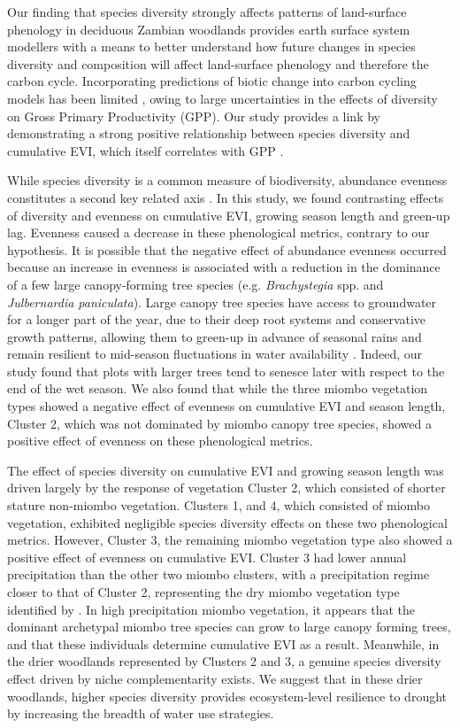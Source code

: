 \begin{refsection}
Our finding that species diversity strongly affects patterns of land-surface phenology in deciduous Zambian woodlands provides earth surface system modellers with a means to better understand how future changes in species diversity and composition will affect land-surface phenology and therefore the carbon cycle. Incorporating predictions of biotic change into carbon cycling models has been limited \citep{Ahlstrom2015, Bodegom2011}, owing to large uncertainties in the effects of diversity on Gross Primary Productivity (GPP). Our study provides a link by demonstrating a strong positive relationship between species diversity and cumulative EVI, which itself correlates with GPP \citep{Sjostrom2011}.

While species diversity is a common measure of biodiversity, abundance evenness constitutes a second key related axis \citep{Wilsey2005, Hillebrand2008, Jost2010}. In this study, we found contrasting effects of diversity and evenness on cumulative EVI, growing season length and green-up lag. Evenness caused a decrease in these phenological metrics, contrary to our hypothesis. It is possible that the negative effect of abundance evenness occurred because an increase in evenness is associated with a reduction in the dominance of a few large canopy-forming tree species (e.g. \textit{Brachystegia} spp. and \textit{Julbernardia paniculata}). Large canopy tree species have access to groundwater for a longer part of the year, due to their deep root systems and conservative growth patterns, allowing them to green-up in advance of seasonal rains and remain resilient to mid-season fluctuations in water availability \citep{Zhou2020}. Indeed, our study found that plots with larger trees tend to senesce later with respect to the end of the wet season. We also found that while the three miombo vegetation types showed a negative effect of evenness on cumulative EVI and season length, Cluster 2, which was not dominated by miombo canopy tree species, showed a positive effect of evenness on these phenological metrics. 

The effect of species diversity on cumulative EVI and growing season length was driven largely by the response of vegetation Cluster 2, which consisted of shorter stature non-miombo vegetation. Clusters 1, and 4, which consisted of miombo vegetation, exhibited negligible species diversity effects on these two phenological metrics. However, Cluster 3, the remaining miombo vegetation type also showed a positive effect of evenness on cumulative EVI. Cluster 3 had lower annual precipitation than the other two miombo clusters, with a precipitation regime closer to that of Cluster 2, representing the dry miombo vegetation type identified by \citet{White1983}. In high precipitation miombo vegetation, it appears that the dominant archetypal miombo tree species can grow to large canopy forming trees, and that these individuals determine cumulative EVI as a result. Meanwhile, in the drier woodlands represented by Clusters 2 and 3, a genuine species diversity effect driven by niche complementarity exists. We suggest that in these drier woodlands, higher species diversity provides ecosystem-level resilience to drought by increasing the breadth of water use strategies. 


\end{refsection}
